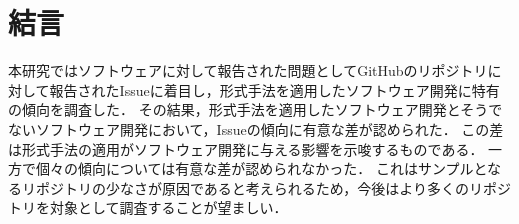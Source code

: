 \documentclass[main]{subfiles}
\begin{document}
\chapter{結言}

本研究ではソフトウェアに対して報告された問題としてGitHubのリポジトリに対して報告されたIssueに着目し，形式手法を適用したソフトウェア開発に特有の傾向を調査した．
その結果，形式手法を適用したソフトウェア開発とそうでないソフトウェア開発において，Issueの傾向に有意な差が認められた．
この差は形式手法の適用がソフトウェア開発に与える影響を示唆するものである．
一方で個々の傾向については有意な差が認められなかった．
これはサンプルとなるリポジトリの少なさが原因であると考えられるため，今後はより多くのリポジトリを対象として調査することが望ましい．
\end{document}
